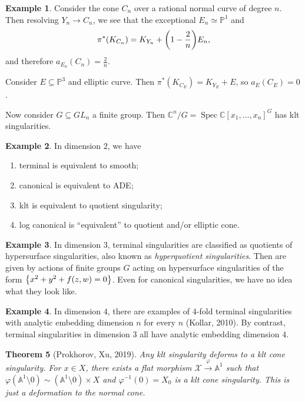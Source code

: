 \documentclass[leqno, openany]{memoir}
\newtheorem{thm}{Theorem}[section]
\theoremstyle{definition}
\newtheorem{exm}[thm]{Example}
\theoremstyle{remark}
\theoremstyle{plain}
\theoremstyle{definition}
\theoremstyle{remark}
\newcommand{\A}{\mathbb{A}}
\newcommand{\C}{\mathbb{C}}
\renewcommand{\P}{\mathbb{P}}
\newcommand{\msc}[1]{\mathscr{#1}}
\DeclareMathOperator{\Spec}{Spec}
\begin{document}
\begin{exm}
    Consider the cone $C_n$ over a rational normal curve of degree $n$. Then resolving $Y_n \to C_n$, we see that the exceptional $E_n \simeq \P^1$ and 
    \[ \pi^* (K_{C_n}) = K_{Y_n} + \qty(1 - \frac{2}{n}) E_n, \] 
    and therefore $a_{E_n}(C_n) = \frac{2}{n}$.

    Consider $E \subseteq \P^3$ and elliptic curve. Then $\pi^*(K_{C_E}) = K_{Y_E} + E$, so $a_E(C_E) = 0$.
\end{exm}

Now consider $G \subseteq GL_n$ a finite group. Then $\C^n/G = \Spec {\C[x_1, \ldots, x_n]}^G$ has klt singularities.

\begin{exm}
    In dimension $2$, we have
    \begin{enumerate}
        \item terminal is equivalent to smooth;
        \item canonical is equivalent to ADE;\@
        \item klt is equivalent to quotient singularity;
        \item log canonical is ``equivalent'' to quotient and/or elliptic cone.
    \end{enumerate}
\end{exm}

\begin{exm}
    In dimension $3$, terminal singularities are classified as quotients of hypersurface singularities, also known as \textit{hyperquotient singularities}. Then are given by actions of finite groups $G$ acting on hypersurface singularities of the form $\qty{x^2 + y^2 + f(z, w) = 0}$. Even for canonical singularities, we have no idea what they look like.
\end{exm}

\begin{exm}
    In dimension $4$, there are examples of $4$-fold terminal singularities with analytic embedding dimension $n$ for every $n$ (Kollar, 2010). By contrast, terminal singularities in dimension $3$ all have analytic embedding dimension $4$.
\end{exm}

\begin{thm}[Prokhorov, Xu, 2019]
    Any klt singularity deforms to a klt cone singularity. For $x \in X$, there exists a flat morphism $\msc{X} \xrightarrow{\varphi} \A^1$ such that $\varphi(\A^1 \setminus 0) \sim (\A^1 \setminus 0) \times X$ and $\varphi^{-1}(0) = X_0$ is a klt cone singularity. This is just a deformation to the normal cone.
\end{thm}
\end{document}
